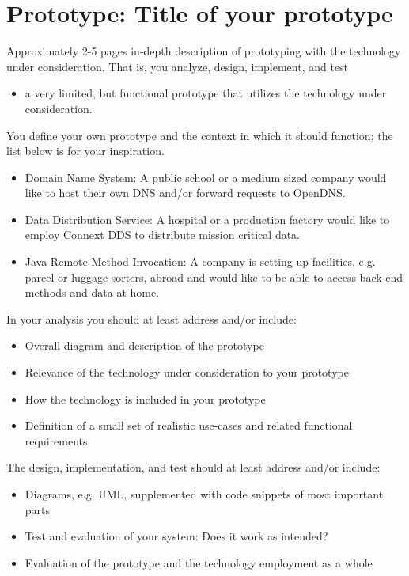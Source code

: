 \documentclass[Preamble]{subfiles}
\begin{document}
\chapter{Prototype: Title of your prototype}

Approximately 2-5 pages in-depth description of prototyping with the
technology under consideration. That is, you analyze, design,
implement, and test
\begin{itemize}
\item a very limited, but functional prototype that utilizes the
  technology under consideration.
\end{itemize}

You define your own prototype and the context in which it should
function; the list below is for your inspiration.

\begin{itemize}
\item Domain Name System: A public school or a medium sized company
  would like to host their own DNS and/or forward requests to OpenDNS.
\item Data Distribution Service: A hospital or a production factory
  would like to employ Connext DDS to distribute mission critical
  data.
\item Java Remote Method Invocation: A company is setting up
  facilities, e.g. parcel or luggage sorters, abroad and would like to
  be able to access back-end methods and data at home.
\end{itemize}

In your analysis you should at least address and/or include:

\begin{itemize}
\item Overall diagram and description of the prototype
\item Relevance of the technology under consideration to your prototype
\item How the technology is included in your prototype
\item Definition of a small set of realistic use-cases and related
  functional requirements
\end{itemize}

The design, implementation, and test should at least address and/or include:

\begin{itemize}
\item Diagrams, e.g. UML, supplemented with code snippets of most important parts
\item Test and evaluation of your system: Does it work as intended?
\item Evaluation of the prototype and the technology employment as a
  whole
\end{itemize}
\end{document}
